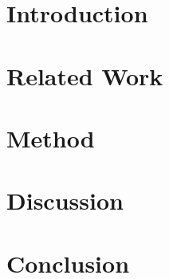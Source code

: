 \documentclass[sigconf,authordraft,anonymous]{acmart}
\begin{document}


\section{Introduction}
\blindtext[3] %

\section{Related Work}
\blindtext[3] %

\section{Method}
\blindtext[3] %

\section{Discussion}
\blindtext[3] %

\section{Conclusion}
\blindtext[3] %


\balance
\end{document}
